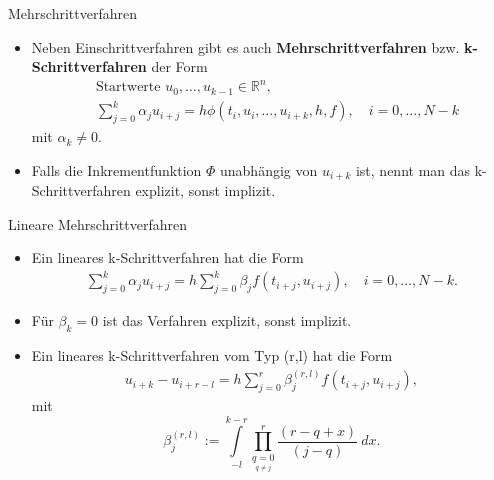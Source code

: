 \begin{frame}{Mehrschrittverfahren}
    \begin{itemize}
        \item<1-> Neben Einschrittverfahren gibt es auch \textbf{Mehrschrittverfahren} bzw. \textbf{k-Schrittverfahren}
        der Form
        \begin{align*}
            &\text{Startwerte } u_0, \dots, u_{k-1} \in \mathbb{R}^n, \nonumber \\
            & \sum_{j=0}^{k} \alpha_j u_{i+j} = h \phi(t_i, u_i, \dots, u_{i+k},h,f), \quad i=0,\dots,N-k
        \end{align*}
        mit $\alpha_k\neq0$.
        \item<2-> Falls die Inkrementfunktion $\Phi$ unabhängig von $u_{i+k}$ ist, nennt man das k-Schrittverfahren
        explizit, sonst implizit.
    \end{itemize}
\end{frame}

\begin{frame}{Lineare Mehrschrittverfahren}
    \begin{itemize}
        \item<1-> Ein lineares k-Schrittverfahren hat die Form
        \begin{align}
              \label{k-schritt-linear}
              \sum_{j=0}^{k} \alpha_j u_{i+j} = h \sum_{j=0}^{k} \beta_j f(t_{i+j}, u_{i+j}), \quad i = 0, \dots, N-k.
        \end{align}
        \item<2-> Für $\beta_k=0$ ist das Verfahren explizit, sonst implizit.
        \item<3-> Ein lineares k-Schrittverfahren vom Typ (r,l) hat die Form
        \begin{align*}
            u_{i+k}-u_{i+r-l} = h \sum_{j=0}^{r} \beta_j^{(r,l)} f(t_{i+j},u_{i+j}),
        \end{align*}
        mit
        \[
            \beta_j^{(r,l)} := \int\limits_{-l}^{k-r} \prod\limits_{\underset{q \neq j}{q=0}}^{r} \frac{(r-q+x)}{(j-q)}\ dx.
        \]
    \end{itemize}
\end{frame}

